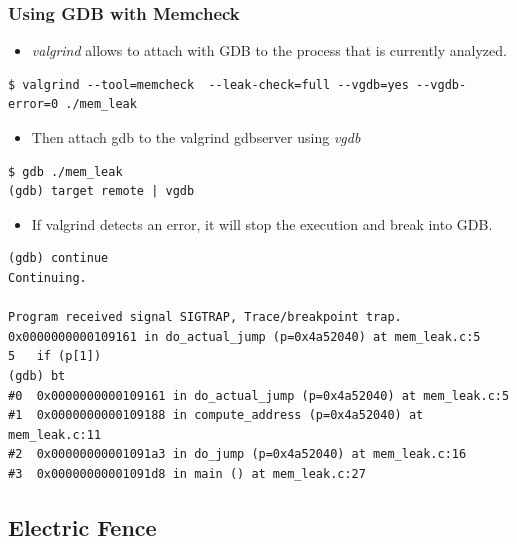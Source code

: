 \begin{frame}[fragile]
  \frametitle{Using GDB with Memcheck}
  \begin{itemize}
    \item {\em valgrind} allows to attach with GDB to the process that is
          currently analyzed.
  \end{itemize}
  \begin{block}{}
    \begin{verbatim}
$ valgrind --tool=memcheck  --leak-check=full --vgdb=yes --vgdb-error=0 ./mem_leak
    \end{verbatim}
  \end{block}

  \begin{itemize}
    \item Then attach gdb to the valgrind gdbserver using {\em vgdb}
  \end{itemize}
  \begin{block}{}
    \begin{verbatim}
$ gdb ./mem_leak
(gdb) target remote | vgdb
    \end{verbatim}
  \end{block}

  \begin{itemize}
    \item If valgrind detects an error, it will stop the execution and break
          into GDB.
  \end{itemize}

  \begin{block}{}
    \begin{verbatim}
(gdb) continue
Continuing.

Program received signal SIGTRAP, Trace/breakpoint trap.
0x0000000000109161 in do_actual_jump (p=0x4a52040) at mem_leak.c:5
5   if (p[1])
(gdb) bt
#0  0x0000000000109161 in do_actual_jump (p=0x4a52040) at mem_leak.c:5
#1  0x0000000000109188 in compute_address (p=0x4a52040) at mem_leak.c:11
#2  0x00000000001091a3 in do_jump (p=0x4a52040) at mem_leak.c:16
#3  0x00000000001091d8 in main () at mem_leak.c:27
    \end{verbatim}
  \end{block}
\end{frame}

\subsection{Electric Fence}

